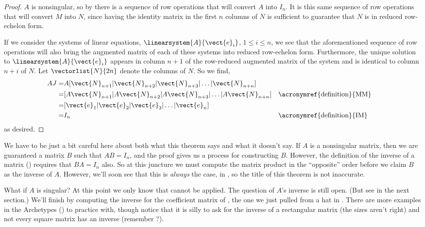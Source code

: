 %
\begin{proof}
$A$ is nonsingular, so by  there is a sequence of row operations that will convert $A$ into $I_n$.  It is this same sequence of row operations that will convert $M$ into $N$, since having the identity matrix in the first $n$ columns of $N$ is sufficient to guarantee that $N$ is in reduced row-echelon form.\par
%
If we consider the systems of linear equations, $\linearsystem{A}{\vect{e}_i}$, $1\leq i\leq n$, we see that the aforementioned sequence of row operations will also bring the augmented matrix of each of these systems into reduced row-echelon form.  Furthermore, the unique solution to $\linearsystem{A}{\vect{e}_i}$ appears in column $n+1$ of the row-reduced augmented matrix of the system and is identical to column $n+i$ of $N$.  Let $\vectorlist{N}{2n}$ denote the columns of $N$.  So we find,
%
\begin{align*}
AJ=&A[\vect{N}_{n+1}|\vect{N}_{n+2}|\vect{N}_{n+3}|\ldots|\vect{N}_{n+n}]\\
=&[A\vect{N}_{n+1}|A\vect{N}_{n+2}|A\vect{N}_{n+3}|\ldots|A\vect{N}_{n+n}]&&\text{\acronymref{definition}{MM}}\\
=&[\vect{e}_1|\vect{e}_2|\vect{e}_3|\ldots|\vect{e}_n]\\
=&I_n&&\text{\acronymref{definition}{IM}}
\end{align*}
%
as desired.
%
\end{proof}
%
We have to be just a bit careful here about both what this theorem says and what it doesn't say.  If $A$ is a nonsingular matrix, then we are guaranteed a matrix $B$ such that $AB=I_n$, and the proof gives us a process for constructing $B$.   However, the definition of the inverse of a matrix () requires that $BA=I_n$ also.  So at this juncture we must compute the matrix product in the ``opposite'' order before we claim $B$ as the inverse of $A$.  However, we'll soon see that this is {\em always} the case, in , so the title of this theorem is not inaccurate.\par
%
What if $A$ is singular?  At this point we only know that  cannot be applied.  The question of $A$'s inverse is still open.  (But see  in the next section.)
%
We'll finish by computing the inverse for the coefficient matrix of , the one we just pulled from a hat in .  There are more examples in the Archetypes () to practice with, though notice that it is silly to ask for the inverse of a rectangular matrix (the sizes aren't right) and not every square matrix has an inverse (remember ?).
